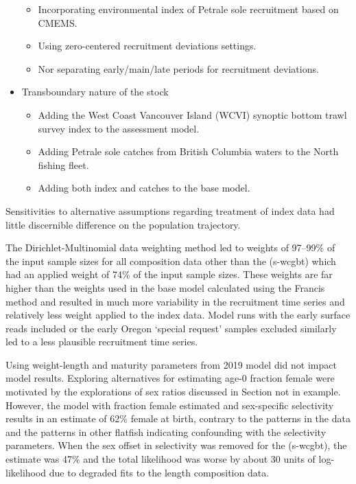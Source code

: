 \documentclass[
]{scrartcl}
\providecommand{\tightlist}{%
  \setlength{\itemsep}{0pt}\setlength{\parskip}{0pt}}\usepackage{longtable,booktabs,array}
\begin{document}
\begin{itemize}
  \begin{itemize}
  \tightlist
  \item
    Incorporating environmental index of Petrale sole recruitment based
    on CMEMS.
  \item
    Using zero-centered recruitment deviations settings.
  \item
    Nor separating early/main/late periods for recruitment deviations.
  \end{itemize}
\item
  Transboundary nature of the stock

  \begin{itemize}
  \tightlist
  \item
    Adding the West Coast Vancouver Island (WCVI) synoptic bottom trawl
    survey index to the assessment model.
  \item
    Adding Petrale sole catches from British Columbia waters to the
    North fishing fleet.
  \item
    Adding both index and catches to the base model.
  \end{itemize}
\end{itemize}

Sensitivities to alternative assumptions regarding treatment of index
data had little discernible difference on the population trajectory.

The Dirichlet-Multinomial data weighting method led to weights of
97--99\% of the input sample sizes for all composition data other than
the (s-wcgbt) which had an applied weight of 74\% of the input sample
sizes. These weights are far higher than the weights used in the base
model calculated using the Francis method and resulted in much more
variability in the recruitment time series and relatively less weight
applied to the index data. Model runs with the early surface reads
included or the early Oregon `special request' samples excluded
similarly led to a less plausible recruitment time series.

Using weight-length and maturity parameters from 2019 model did not
impact model results. Exploring alternatives for estimating age-0
fraction female were motivated by the explorations of sex ratios
discussed in Section not in example. However, the model with fraction
female estimated and sex-specific selectivity results in an estimate of
62\% female at birth, contrary to the patterns in the data and the
patterns in other flatfish indicating confounding with the selectivity
parameters. When the sex offset in selectivity was removed for the
(s-wcgbt), the estimate was 47\% and the total likelihood was worse by
about 30 units of log-likelihood due to degraded fits to the length
composition data.
\end{document}
